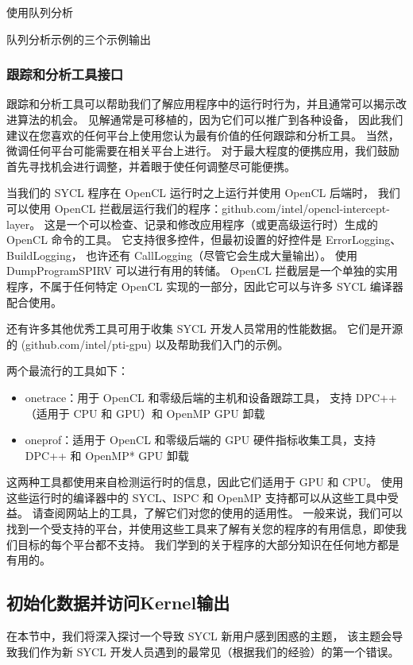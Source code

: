 {\color{red} 使用队列分析}

{\color{red} 队列分析示例的三个示例输出}

\subsubsection{跟踪和分析工具接口}
跟踪和分析工具可以帮助我们了解应用程序中的运行时行为，并且通常可以揭示改进算法的机会。 
见解通常是可移植的，因为它们可以推广到各种设备，
因此我们建议在您喜欢的任何平台上使用您认为最有价值的任何跟踪和分析工具。 
当然，微调任何平台可能需要在相关平台上进行。 
对于最大程度的便携应用，我们鼓励首先寻找机会进行调整，并着眼于使任何调整尽可能便携。

当我们的 SYCL 程序在 OpenCL 运行时之上运行并使用 OpenCL 后端时，
我们可以使用 OpenCL 拦截层运行我们的程序：github.com/intel/opencl-intercept-layer。 
这是一个可以检查、记录和修改应用程序（或更高级运行时）生成的 OpenCL 命令的工具。 
它支持很多控件，但最初设置的好控件是 ErrorLogging、BuildLogging，
也许还有 CallLogging（尽管它会生成大量输出）。 使用 DumpProgramSPIRV 可以进行有用的转储。 
OpenCL 拦截层是一个单独的实用程序，不属于任何特定 OpenCL 实现的一部分，因此它可以与许多 SYCL 编译器配合使用。

还有许多其他优秀工具可用于收集 SYCL 开发人员常用的性能数据。 
它们是开源的 (github.com/intel/pti-gpu) 以及帮助我们入门的示例。

两个最流行的工具如下：

\begin{itemize}
	\item onetrace：用于 OpenCL 和零级后端的主机和设备跟踪工具，
	支持 DPC++（适用于 CPU 和 GPU）和 OpenMP GPU 卸载

	\item oneprof：适用于 OpenCL 和零级后端的 GPU 硬件指标收集工具，支持 DPC++ 和 OpenMP* GPU 卸载
\end{itemize}

这两种工具都使用来自检测运行时的信息，因此它们适用于 GPU 和 CPU。 
使用这些运行时的编译器中的 SYCL、ISPC 和 OpenMP 支持都可以从这些工具中受益。 
请查阅网站上的工具，了解它们对您的使用的适用性。 
一般来说，我们可以找到一个受支持的平台，并使用这些工具来了解有关您的程序的有用信息，即使我们目标的每个平台都不支持。 
我们学到的关于程序的大部分知识在任何地方都是有用的。

\subsection{初始化数据并访问Kernel输出}
在本节中，我们将深入探讨一个导致 SYCL 新用户感到困惑的主题，
该主题会导致我们作为新 SYCL 开发人员遇到的最常见（根据我们的经验）的第一个错误。


